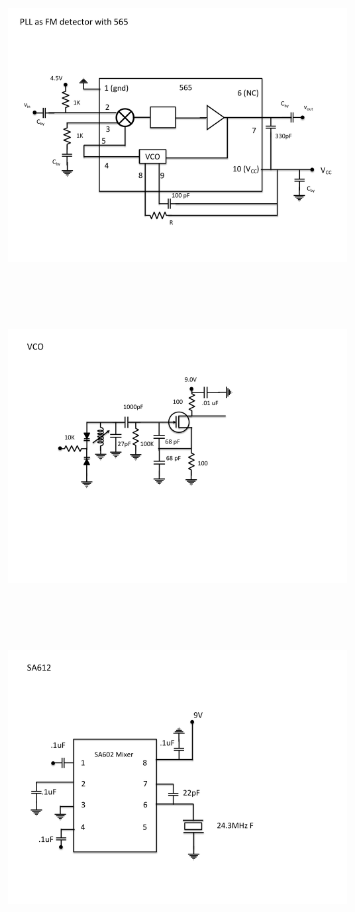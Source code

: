 \begin{figure} 
\center
\includegraphics[width=0.8\textwidth,natwidth=642,natheight=610, height=80mm, width=88mm]{circuit18.pdf}
\end{figure}
\begin{figure} 
\center
\includegraphics[width=0.8\textwidth,natwidth=642,natheight=610, height=80mm, width=88mm]{circuit19.pdf}
\end{figure}
\begin{figure} 
\center
\includegraphics[width=0.8\textwidth,natwidth=642,natheight=610, height=80mm, width=88mm]{circuit20.pdf}
\end{figure}
